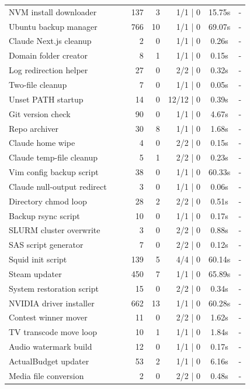 \begin{longtable}{@{\extracolsep{\fill}}lllrrrcl@{}}
NVM install downloader &  &  & 137 & 3 & 1/1 | 0 & 15.75s & -  \\
Ubuntu backup manager &  &  & 766 & 10 & 1/1 | 0 & 69.07s & -  \\
Claude Next.js cleanup &  &  & 2 & 0 & 1/1 | 0 & 0.26s & -  \\
Domain folder creator &  &  & 8 & 1 & 1/1 | 0 & 0.15s & -  \\
Log redirection helper &  &  & 27 & 0 & 2/2 | 0 & 0.32s & -  \\
Two-file cleanup &  &  & 7 & 0 & 1/1 | 0 & 0.05s & -  \\
Unset PATH startup &  &  & 14 & 0 & 12/12 | 0 & 0.39s & -  \\
Git version check &  &  & 90 & 0 & 1/1 | 0 & 4.67s & -  \\
Repo archiver &  &  & 30 & 8 & 1/1 | 0 & 1.68s & -  \\
Claude home wipe &  &  & 4 & 0 & 2/2 | 0 & 0.15s & -  \\
Claude temp-file cleanup &  &  & 5 & 1 & 2/2 | 0 & 0.23s & -  \\
Vim config backup script &  &  & 38 & 0 & 1/1 | 0 & 60.33s & -  \\
Claude null-output redirect &  &  & 3 & 0 & 1/1 | 0 & 0.06s & -  \\
Directory chmod loop &  &  & 28 & 2 & 2/2 | 0 & 0.51s & -  \\
Backup rsync script &  &  & 10 & 0 & 1/1 | 0 & 0.17s & -  \\
SLURM cluster overwrite &  &  & 3 & 0 & 2/2 | 0 & 0.88s & -  \\
SAS script generator &  &  & 7 & 0 & 2/2 | 0 & 0.12s & -  \\
Squid init script &  &  & 139 & 5 & 4/4 | 0 & 60.14s & -  \\
Steam updater &  &  & 450 & 7 & 1/1 | 0 & 65.89s & -  \\
System restoration script &  &  & 15 & 0 & 2/2 | 0 & 0.34s & -  \\
NVIDIA driver installer &  &  & 662 & 13 & 1/1 | 0 & 60.28s & -  \\
Contest winner mover &  &  & 11 & 0 & 2/2 | 0 & 1.62s & -  \\
TV transcode move loop &  &  & 10 & 1 & 1/1 | 0 & 1.84s & -  \\
Audio watermark build &  &  & 12 & 0 & 1/1 | 0 & 0.17s & -  \\
ActualBudget updater &  &  & 53 & 2 & 1/1 | 0 & 6.16s & -  \\
Media file conversion &  &  & 2 & 0 & 2/2 | 0 & 0.48s & -  \\

\end{longtable}
